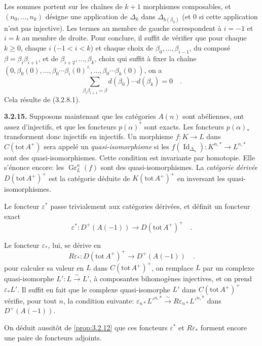 \documentclass[12pt,a4paper]{article}
\theoremstyle{plain}
\theoremstyle{definition}
\DeclareMathOperator{\Id}{Id}
\DeclareMathOperator{\Gr}{Gr}
\newcommand{\isom}{\xrightarrow{\sim}}
\begin{document}
Les sommes portent sur les cha\^{i}nes de $k+1$ morphismes composables, et $(n_{0},\ldots,n_{k})$ d\'{e}signe une application de $\Delta_{k}$ dans $\Delta_{b(\beta_{0})}$ (et $0$ si cette application n'est pas injective). Les termes au membre de gauche correspondent \`{a} $i=-1$ et $i=k$ au membre de droite. Pour conclure, il suffit de v\'{e}rifier que pour chaque $k \geq 0$, chaque $i$ ($-1 < i < k$) et chaque choix de $\beta_{0},\ldots,\beta_{i-1}$, du compos\'{e} $\beta = \beta_{i}\beta_{i+1}$, et de $\beta_{i+2},\ldots,\beta_{k}$, choix qui suffit \`{a} fixer la cha\^{i}ne $(0,\beta_{0}(0),\ldots,\beta_{0}\cdots\beta_{i}(0)^{\wedge},\ldots,\beta_{0}\cdots\beta_{k}(0))$, on a
\[
\sum_{\beta_{i}\beta_{i+1}=\beta} d(\beta_{0})\cdots d(\beta_{k}) = 0\quad.
\]
Cela r\'{e}sulte de (3.2.8.1).

\noindent\textbf{3.2.15.} Supposons maintenant que les cat\'{e}gories $A(n)$ sont ab\'{e}liennes, ont assez d'injectifs, et que les foncteurs $p(\alpha)^{*}$ sont exacts. Les foncteurs $p(\alpha)_{*}$ transforment donc injectifs en injectifs. Un morphisme $f: K \to L$ dans $C(\mathrm{tot}\, A^{+})$ sera appel\'{e} un \emph{quasi-isomorphisme} si les $f(\Id_{\Delta_{n}}): K^{n,*} \to L^{n,*}$ sont des quasi-isomorphismes. Cette condition est invariante par homotopie. Elle s'\'{e}nonce encore: les $\Gr^{n}_{L}(f)$ sont des quasi-isomorphismes. La \emph{cat\'{e}gorie d\'{e}riv\'{e}e} $D(\mathrm{tot}\, A^{+})^{+}$ est la cat\'{e}gorie d\'{e}duite de $K(\mathrm{tot}\, A^{+})^{+}$ en inversant les quasi-isomorphismes.

Le foncteur $\varepsilon^{*}$ passe trivialement aux cat\'{e}gories d\'{e}riv\'{e}es, et d\'{e}finit un foncteur exact
\[
\varepsilon^{*}: D^{+}(A(-1)) \longrightarrow D(\mathrm{tot}\, A^{+})^{+}\quad.
\]

Le foncteur $\varepsilon_{*}$, lui, se d\'{e}rive en
\[
R\varepsilon_{*}: D(\mathrm{tot}\, A^{+})^{+} \longrightarrow D^{+}(A(-1))\quad.
\]
pour calculer sa valeur en $L$ dans $C(\mathrm{tot}\, A^{+})^{+}$, on remplace $L$ par un complexe quasi-isomorphe $L': L \isom L'$, \`{a} composantes bihomog\`{e}nes injectives, et on prend $\varepsilon_{*}L'$. Il suffit en fait que le complexe quasi-isomorphe $L'$ dans $C(\mathrm{tot}\, A^{+})^{+}$ v\'{e}rifie, pour tout $n$, la condition suivante: $\varepsilon_{n*}L'^{n,*} \isom R\varepsilon_{n*}L'^{n,*}$ dans $D^{+}(A(-1))$.

On d\'{e}duit aussit\^{o}t de \ref{prop:3.2.12} que ces foncteurs $\varepsilon^{*}$ et $R\varepsilon_{*}$ forment encore une paire de foncteurs adjoints.
\end{document}
